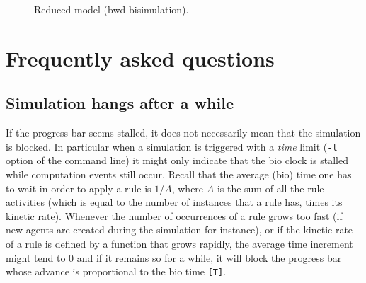 \documentclass[11pt]{book}
\def\ttt#1{\texttt{#1}}
\begin{document}
\begin{figure}[htp]
\centering\begin{minipage}{0.25\linewidth}
\end{minipage}\caption{Reduced model (bwd bisimulation).}
\end{figure}

\chapter{Frequently asked questions}
\section*{Simulation hangs after a while}
If the progress bar seems stalled, it does not necessarily mean that the simulation is blocked. In particular when a simulation is triggered with a \emph{time} limit (\ttt{-l} option of the command line) it might only indicate that the bio clock is stalled while computation events still occur. Recall that the average (bio) time one has to wait in order to apply a rule is $1/A$, where $A$ is the sum of all the rule activities (which is equal to the number of instances that a rule has, times its kinetic rate). Whenever the number of occurrences of a rule grows too fast (if new agents are created during the simulation for instance), or if the kinetic rate of a rule is defined by a function that grows rapidly, the average time increment might tend to 0 and if it remains so for a while, it will block the progress bar whose advance is proportional to the bio time \ttt{[T]}.
\end{document}

